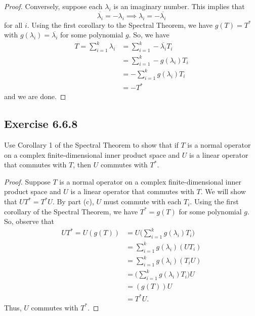 \begin{enumerate}
\begin{proof}
        Conversely, suppose each \( {\lambda}_{i}  \) is an imaginary number. This implies that 
        \[  \overline{{\lambda}_{i}} = - {\lambda}_{i} \implies {\lambda}_{i} = - \overline{{\lambda}_{i}} \]
        for all \( i  \). Using the first corollary to the Spectral Theorem, we have \( g(T) = T^{*} \) with \( g({\lambda}_{i}) = \overline{{\lambda}_{i}} \) for some polynomial \( g \). So, we have 
        \begin{align*}
           T = \sum_{ i=1  }^{ k  } {\lambda}_{i} &= \sum_{ i=1  }^{ k  } - \overline{{\lambda}_{i}} {T}_{i}   \\
                                                  &= \sum_{ i=1  }^{ k  } - g({\lambda}_{i}) {T}_{i} \\
                                                  &= - \sum_{ i=1  }^{ k   } g({\lambda}_{i}) {T}_{i} \\
                                                  &= - T^{*}
        \end{align*}
        and we are done.
    \end{proof}
\end{enumerate}

\subsection*{Exercise 6.6.8} Use Corollary 1 of the Spectral Theorem to show that if \( T  \) is a normal operator on a complex finite-dimensional inner product space and \( U  \) is a linear operator that commutes with \( T  \), then \( U  \) commutes with \( T^{*} \). 
\begin{proof}
Suppose \( T  \) is a normal operator on a complex finite-dimensional inner product space and \( U  \) is a linear operator that commutes with \( T  \). We will show that \( U T^{*} = T^{*}U  \). By part (c), \( U  \) must commute with each \( {T}_{i} \). Using the first corollary of the Spectral Theorem, we have \( T^{*} = g(T) \) for some polynomial \( g \). So, observe that
\begin{align*}
    U T^{*}  = U (g(T)) &= U \Big(  \sum_{ i=1  }^{ k  } g({\lambda}_{i}) {T}_{i} \Big) \\
                        &= \sum_{ i=1  }^{ k  } g({\lambda}_{i}) (U {T}_{i}) \\ 
                        &= \sum_{ i=1  }^{ k  } g({\lambda}_{i}) ({T}_{i} U) \\ 
                        &= \Big(  \sum_{ i=1  }^{ k  } g({\lambda}_{i}) {T}_{i} \Big) U \\
                        &= (g(T))U \\
                        &= T^{*} U.
\end{align*}
Thus, \( U  \) commutes with \( T^{*} \).
\end{proof}

